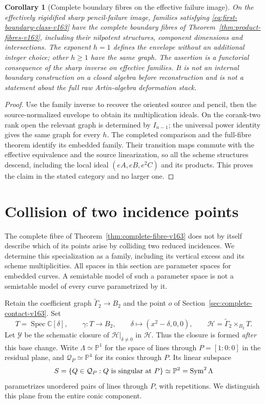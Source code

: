 \documentclass[11pt,reqno]{amsart}
\numberwithin{equation}{section}
\newtheorem{corollary}[theorem]{Corollary}
\theoremstyle{definition}\newtheorem{definition}[theorem]{Definition}
\theoremstyle{remark}\newtheorem{remark}[theorem]{Remark}
\newcommand{\C}{\mathbb C}\newcommand{\Q}{\mathbb Q}
\newcommand{\Pj}{\mathbb P}\newcommand{\A}{\mathbb A}
\DeclareMathOperator{\Spec}{Spec}\DeclareMathOperator{\PGL}{PGL}
\begin{document}
\begin{corollary}[Complete boundary fibres on the effective failure image]
\label{cor:effective-full-fibres-v163}
On the effectively rigidified sharp pencil-failure image, families
satisfying \eqref{eq:first-boundary-class-v163} have the complete
boundary fibres of Theorem~\ref{thm:product-fibres-v163}, including
their nilpotent structures, component dimensions and intersections.
The exponent $h=1$ defines the envelope without an additional integer
choice; other $h\geq1$ have the same graph. The assertion is a
functorial consequence of the sharp inverse on effective families.
It is not an internal boundary construction on a closed algebra
before reconstruction and is not a statement about the full raw
Artin-algebra deformation stack.
\end{corollary}
\begin{proof}
Use the family inverse to recover the oriented source and pencil,
then the source-normalized envelope to obtain its multiplication
ideals. On the corank-two rank open the relevant graph is determined
by $I_{n-1}$; the universal power identity gives the same graph for
every $h$. The completed comparison and the full-fibre theorem
identify its embedded family. Their transition maps commute with
the effective equivalence and the source linearization, so all the
scheme structures descend, including the local ideal
$(eA,eB,e^2C)$ and its products. This proves the claim in the stated
category and no larger one.
\end{proof}

\section{Collision of two incidence points}
\label{sec:collision-family-v164}
The complete fibre of Theorem~\ref{thm:complete-fibre-v163} does not
by itself describe which of its points arise by colliding two reduced
incidences. We determine this specialization as a family, including
its vertical excess and its scheme multiplicities. All spaces in this
section are parameter spaces for embedded curves. A semistable model
of such a parameter space is not a semistable model of every curve
parametrized by it.

Retain the coefficient graph $\widetilde\Gamma_2\to B_2$ and the
point $o$ of Section~\ref{sec:complete-contact-v163}. Set
\begin{equation}\label{eq:collision-base-v164}
 T=\Spec\C[\delta],\qquad
 \gamma:T\longrightarrow B_2,\qquad
 \delta\longmapsto(x^2-\delta,0,0),\qquad
 \mathcal H=\widetilde\Gamma_2\times_{B_2}T.
\end{equation}
Let $\mathcal Y$ be the schematic closure of
$\mathcal H|_{\delta\ne0}$ in $\mathcal H$. Thus the closure is
formed \emph{after} this base change. Write $\Lambda\simeq\Pj^1$
for the space of lines through $P=[1:0:0]$ in the residual plane,
and $\mathcal Q_P\simeq\Pj^4$ for its conics through $P$.
Its linear subspace
\[
 S=\{Q\in\mathcal Q_P:Q\hbox{ is singular at }P\}\simeq\Pj^2
       =\operatorname{Sym}^2\Lambda
\]
parametrizes unordered pairs of lines through $P$, with repetitions.
We distinguish this plane from the entire conic component.
\end{document}
